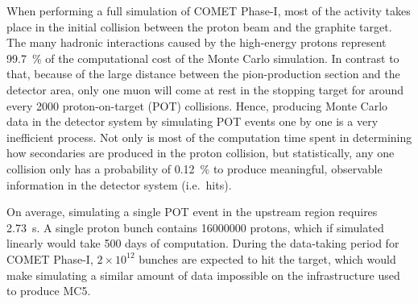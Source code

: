 When performing a full simulation of COMET Phase-I, most of the activity takes place in the initial collision between the proton beam and the graphite target. The many hadronic interactions caused by the high-energy protons represent \SI{99.7}{\percent} of the computational cost of the Monte Carlo simulation.
In contrast to that, because of the large distance between the pion-production section and the detector area, only one muon will come at rest in the stopping target for around every \num{2000} proton-on-target (POT) collisions. Hence, producing Monte Carlo data in the detector system by simulating POT events one by one is a very inefficient process. Not only is most of the computation time spent in determining how secondaries are produced in the proton collision, but statistically, any one collision only has a probability of \SI{0.12}{\percent} to produce meaningful, observable information in the detector system (i.e.\ hits).

On average, simulating a single POT event in the upstream region requires \SI{2.73}{\second}. A single proton bunch contains \num{16000000} protons, which if simulated linearly would take 500 days of computation. During the data-taking period for COMET Phase-I, $2\times10^{12}$ bunches are expected to hit the target, which would make simulating a similar amount of data impossible on the infrastructure used to produce MC5.


